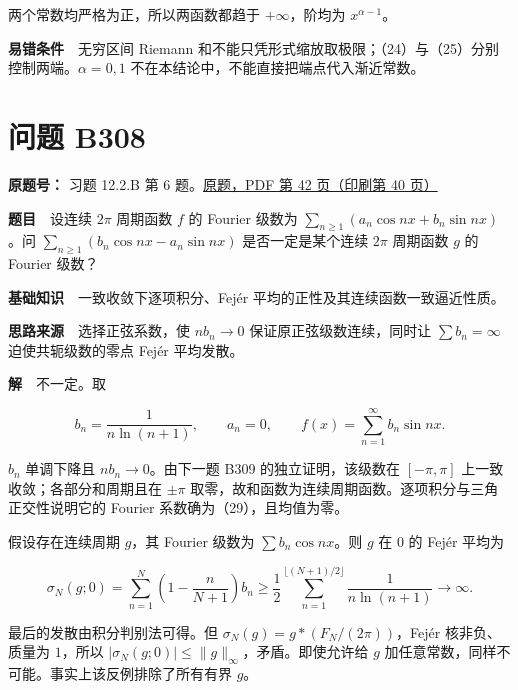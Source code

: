 \documentclass[11pt,a4paper]{article}
\begin{document}
两个常数均严格为正，所以两函数都趋于 \(+\infty\)，阶均为
\(x^{\alpha-1}\)。

\textbf{易错条件}　无穷区间 Riemann
和不能只凭形式缩放取极限；（24）与（25）分别控制两端。\(\alpha=0,1\)
不在本结论中，不能直接把端点代入渐近常数。

\section{问题 B308}\label{ux95eeux9898-b308}

\textbf{原题号：} 习题 12.2.B 第 6
题。\href{https://zj139.github.io/math-notes/files/problems/楼分析习题-v2.pdf\#page=42}{原题，PDF
第 42 页（印刷第 40 页）}

\textbf{题目}　设连续 \(2\pi\) 周期函数 \(f\) 的 Fourier 级数为
\(\sum_{n\ge1}(a_n\cos nx+b_n\sin nx)\)。问
\(\sum_{n\ge1}(b_n\cos nx-a_n\sin nx)\) 是否一定是某个连续 \(2\pi\)
周期函数 \(g\) 的 Fourier 级数？

\textbf{基础知识}　一致收敛下逐项积分、Fejér
平均的正性及其连续函数一致逼近性质。

\textbf{思路来源}　选择正弦系数，使 \(nb_n\to0\)
保证原正弦级数连续，同时让 \(\sum b_n=\infty\) 迫使共轭级数的零点 Fejér
平均发散。

\textbf{解}　不一定。取

\begin{equation}
b_n=\frac1{n\ln(n+1)},\qquad a_n=0,\qquad
f(x)=\sum_{n=1}^{\infty}b_n\sin nx.
\tag{29}
\end{equation}

\(b_n\) 单调下降且 \(nb_n\to0\)。由下一题 B309 的独立证明，该级数在
\([-\pi,\pi]\) 上一致收敛；各部分和周期且在 \(\pm\pi\)
取零，故和函数为连续周期函数。逐项积分与三角正交性说明它的 Fourier
系数确为（29），且均值为零。

假设存在连续周期 \(g\)，其 Fourier 级数为 \(\sum b_n\cos nx\)。则 \(g\)
在 \(0\) 的 Fejér 平均为

\begin{equation}
\sigma_N(g;0)=\sum_{n=1}^{N}\left(1-\frac n{N+1}\right)b_n
\ge\frac12\sum_{n=1}^{\lfloor(N+1)/2\rfloor}\frac1{n\ln(n+1)}\longrightarrow\infty.
\tag{30}
\end{equation}

最后的发散由积分判别法可得。但 \(\sigma_N(g)=g*(F_N/(2\pi))\)，Fejér
核非负、质量为 \(1\)，所以
\(|\sigma_N(g;0)|\le\|g\|_\infty\)，矛盾。即使允许给 \(g\)
加任意常数，同样不可能。事实上该反例排除了所有有界 \(g\)。
\end{document}
